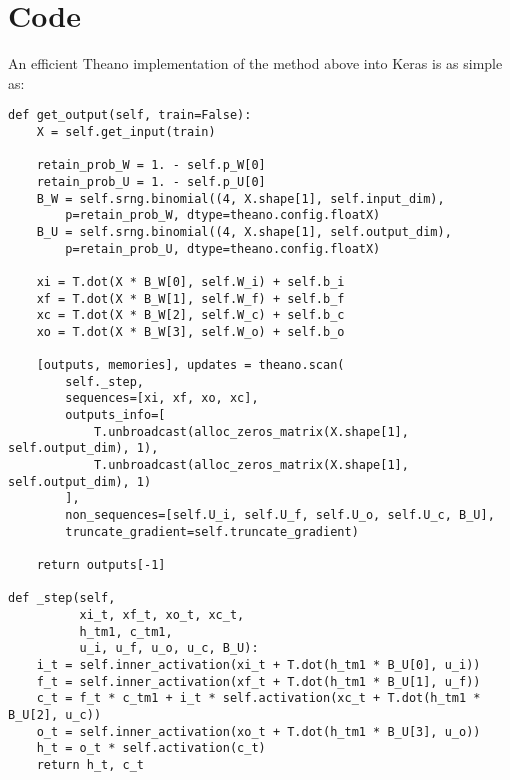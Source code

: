 \documentclass{article}
\theoremstyle{definition}
\begin{document}
\newpage
\section{Code}
\label{sec:code}
An efficient Theano \citep{bergstra+al:2010-scipy} implementation of the method above into Keras \citep{keras2015} is as simple as:

\begin{verbatim}
def get_output(self, train=False):
    X = self.get_input(train)

    retain_prob_W = 1. - self.p_W[0]
    retain_prob_U = 1. - self.p_U[0]
    B_W = self.srng.binomial((4, X.shape[1], self.input_dim), 
        p=retain_prob_W, dtype=theano.config.floatX)
    B_U = self.srng.binomial((4, X.shape[1], self.output_dim), 
        p=retain_prob_U, dtype=theano.config.floatX)

    xi = T.dot(X * B_W[0], self.W_i) + self.b_i
    xf = T.dot(X * B_W[1], self.W_f) + self.b_f
    xc = T.dot(X * B_W[2], self.W_c) + self.b_c
    xo = T.dot(X * B_W[3], self.W_o) + self.b_o

    [outputs, memories], updates = theano.scan(
        self._step,
        sequences=[xi, xf, xo, xc],
        outputs_info=[
            T.unbroadcast(alloc_zeros_matrix(X.shape[1], self.output_dim), 1),
            T.unbroadcast(alloc_zeros_matrix(X.shape[1], self.output_dim), 1)
        ],
        non_sequences=[self.U_i, self.U_f, self.U_o, self.U_c, B_U],
        truncate_gradient=self.truncate_gradient)

    return outputs[-1]
    
def _step(self,
          xi_t, xf_t, xo_t, xc_t,
          h_tm1, c_tm1,
          u_i, u_f, u_o, u_c, B_U):
    i_t = self.inner_activation(xi_t + T.dot(h_tm1 * B_U[0], u_i))
    f_t = self.inner_activation(xf_t + T.dot(h_tm1 * B_U[1], u_f))
    c_t = f_t * c_tm1 + i_t * self.activation(xc_t + T.dot(h_tm1 * B_U[2], u_c))
    o_t = self.inner_activation(xo_t + T.dot(h_tm1 * B_U[3], u_o))
    h_t = o_t * self.activation(c_t)
    return h_t, c_t
\end{verbatim}
\end{document}

